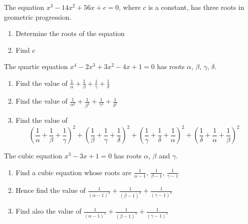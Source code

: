 \documentclass[leqno]{article}
\begin{document}
\begin{enumerate}[
  label=\textbf{\arabic*.},
  leftmargin=*,
  topsep=0pt,
  partopsep=0pt,
  parsep=0pt
]
\newpage

\questionitem

The equation $x^3 - 14x^2 + 56x + c = 0$, where $c$ is a constant, has three roots in geometric progression. \\

\begin{enumerate}[label=\textbf{(\alph*)}]
  \item Determine the roots of the equation  \\
  \item Find $c$  \\
\end{enumerate}

\newpage

\questionitem

The quartic equation $x^4-2x^3+3x^2-4x+1=0$ has roots $\alpha$, $\beta$, $\gamma$, $\delta$. \\

\begin{enumerate}[label=\textbf{(\alph*)}]
  \item Find the value of $\frac{1}{\alpha}+\frac{1}{\beta}+\frac{1}{\gamma}+\frac{1}{\delta}$  \\
  \item Find the value of $\frac{1}{\alpha^2}+\frac{1}{\beta^2}+\frac{1}{\gamma^2}+\frac{1}{\delta^2}$  \\
  \item Find the value of
  \[
  \left(\dfrac{1}{\alpha}+\dfrac{1}{\beta}+\dfrac{1}{\gamma}\right)^2+\left(\dfrac{1}{\beta}+\dfrac{1}{\gamma}+\dfrac{1}{\delta}\right)^2+\left(\dfrac{1}{\gamma}+\dfrac{1}{\delta}+\dfrac{1}{\alpha}\right)^2+\left(\dfrac{1}{\delta}+\dfrac{1}{\alpha}+\dfrac{1}{\beta}\right)^2
  \]
\end{enumerate}

\newpage

\questionitem

The cubic equation $x^3-3x+1=0$ has roots $\alpha$, $\beta$ and $\gamma$. \\

\begin{enumerate}[label=\textbf{(\alph*)}]
  \item Find a cubic equation whose roots are $\frac{1}{\alpha-1}$, $\frac{1}{\beta-1}$, $\frac{1}{\gamma-1}$  \\
  \item Hence find the value of $\frac{1}{(\alpha-1)^2}+\frac{1}{(\beta-1)^2}+\frac{1}{(\gamma-1)^2}$  \\
  \item Find also the value of $\frac{1}{(\alpha-1)^5}+\frac{1}{(\beta-1)^5}+\frac{1}{(\gamma-1)^5}$  \\
\end{enumerate}


\end{enumerate}
\end{document}
